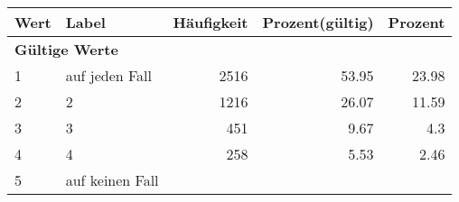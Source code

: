      \begin{longtable}{lXrrr}
     \toprule
     \textbf{Wert} & \textbf{Label} & \textbf{Häufigkeit} & \textbf{Prozent(gültig)} & \textbf{Prozent} \\
     \endhead
     \midrule
     \multicolumn{5}{l}{\textbf{Gültige Werte}}\\

     1 &
     \multicolumn{1}{X}{ auf jeden Fall   } &


       \num{2516} &
       \num[round-mode=places,round-precision=2]{53.95} &
         \num[round-mode=places,round-precision=2]{23.98} \\

     2 &
     \multicolumn{1}{X}{ 2   } &


       \num{1216} &
       \num[round-mode=places,round-precision=2]{26.07} &
         \num[round-mode=places,round-precision=2]{11.59} \\

     3 &
     \multicolumn{1}{X}{ 3   } &


       \num{451} &
       \num[round-mode=places,round-precision=2]{9.67} &
         \num[round-mode=places,round-precision=2]{4.3} \\

     4 &
     \multicolumn{1}{X}{ 4   } &


       \num{258} &
       \num[round-mode=places,round-precision=2]{5.53} &
         \num[round-mode=places,round-precision=2]{2.46} \\

     5 &
     \multicolumn{1}{X}{ auf keinen Fall   } &



\end{longtable}

